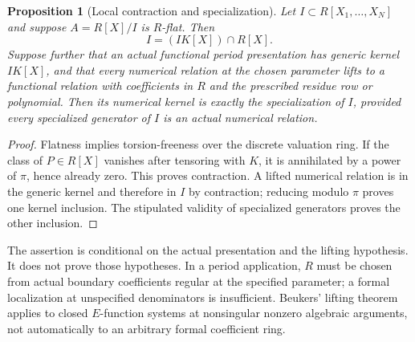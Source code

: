 \documentclass[11pt]{article}
\numberwithin{equation}{section}
\newtheorem{proposition}[proposition]{Proposition}
\theoremstyle{definition}
\theoremstyle{remark}
\begin{document}
\begin{proposition}[Local contraction and specialization]\label{prop:local}
Let $I\subset R[X_1,\ldots,X_N]$ and suppose
$A=R[X]/I$ is $R$-flat. Then
\[
 I=(I K[X])\cap R[X].
\]
Suppose further that an actual functional period presentation has generic
kernel $I K[X]$, and that every numerical relation at the chosen parameter
lifts to a functional relation with coefficients in $R$ and the prescribed
residue row or polynomial. Then its numerical kernel is exactly the
specialization of $I$, provided every specialized generator of $I$ is an
actual numerical relation.
\end{proposition}
\begin{proof}
Flatness implies torsion-freeness over the discrete valuation ring.
If the class of $P\in R[X]$ vanishes after tensoring with $K$, it is
annihilated by a power of $\pi$, hence already zero. This proves
contraction. A lifted numerical relation is in the generic kernel and
therefore in $I$ by contraction; reducing modulo $\pi$ proves one kernel
inclusion. The stipulated validity of specialized generators proves the
other inclusion.
\end{proof}
The assertion is conditional on the actual presentation and the lifting
hypothesis. It does not prove those hypotheses. In a period application,
$R$ must be chosen from actual boundary coefficients regular at the
specified parameter; a formal localization at unspecified denominators
is insufficient. Beukers' lifting theorem \cite{Beukers} applies to
closed $E$-function systems at nonsingular nonzero algebraic arguments,
not automatically to an arbitrary formal coefficient ring.
\end{document}
